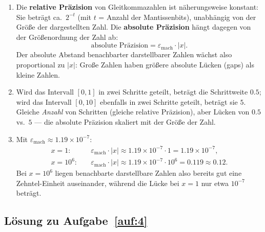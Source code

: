 \documentclass[a4paper,11pt]{scrartcl}
\begin{document}
\begin{enumerate}[label=(\alph*)]
  \item Die \textbf{relative Präzision} von Gleitkommazahlen ist näherungsweise konstant: Sie beträgt ca.\ $2^{-t}$ (mit $t$ = Anzahl der Mantissenbits), unabhängig von der Größe der dargestellten Zahl. Die \textbf{absolute Präzision} hängt dagegen von der Größenordnung der Zahl ab:
  \[
  \text{absolute Präzision} = \varepsilon_{\text{mach}} \cdot |x|.
  \]
  Der absolute Abstand benachbarter darstellbarer Zahlen wächst also proportional zu $|x|$: Große Zahlen haben größere absolute Lücken (gaps) als kleine Zahlen.
  \item Wird das Intervall $[0,1]$ in zwei Schritte geteilt, beträgt die Schrittweite $0.5$; wird das Intervall $[0,10]$ ebenfalls in zwei Schritte geteilt, beträgt sie $5$. Gleiche \emph{Anzahl} von Schritten (gleiche relative Präzision), aber Lücken von $0.5$ vs.\ $5$ --- die absolute Präzision skaliert mit der Größe der Zahl.
  \item Mit $\varepsilon_{\text{mach}} \approx 1.19 \times 10^{-7}$:
  \begin{align*}
  x = 1:&\quad \varepsilon_{\text{mach}} \cdot |x| \approx 1.19 \times 10^{-7} \cdot 1 = 1.19 \times 10^{-7},\\
  x = 10^6:&\quad \varepsilon_{\text{mach}} \cdot |x| \approx 1.19 \times 10^{-7} \cdot 10^6 = 0.119 \approx 0.12.
  \end{align*}
  Bei $x = 10^6$ liegen benachbarte darstellbare Zahlen also bereits gut eine Zehntel-Einheit auseinander, während die Lücke bei $x = 1$ nur etwa $10^{-7}$ beträgt.
\end{enumerate}

\subsection*{Lösung zu Aufgabe~\ref{auf:4}}
\end{document}
